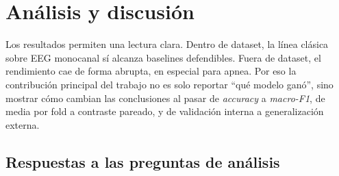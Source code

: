 \section{An\'alisis y discusi\'on}

Los resultados permiten una lectura clara. Dentro de dataset, la l\'inea cl\'asica sobre EEG monocanal s\'i alcanza baselines defendibles. Fuera de dataset, el rendimiento cae de forma abrupta, en especial para apnea. Por eso la contribuci\'on principal del trabajo no es solo reportar ``qu\'e modelo gan\'o'', sino mostrar c\'omo cambian las conclusiones al pasar de \emph{accuracy} a \emph{macro-F1}, de media por fold a contraste pareado, y de validaci\'on interna a generalizaci\'on externa.

\subsection{Respuestas a las preguntas de an\'alisis}

